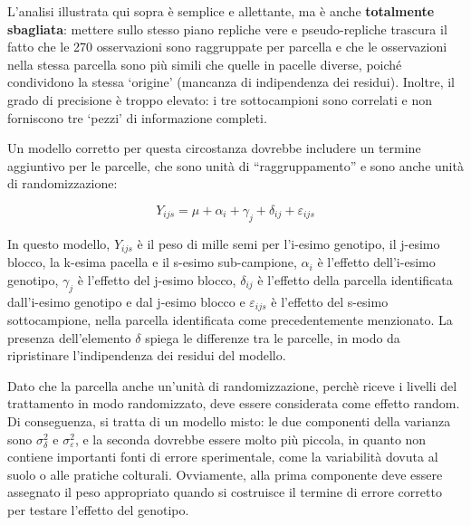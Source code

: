 \documentclass[
  12pt,
]{book}
\newenvironment{Shaded}{\begin{snugshade}}{\end{snugshade}}
\newcommand{\CommentTok}[1]{\textcolor[rgb]{0.56,0.35,0.01}{\textit{#1}}}
\newcommand{\DocumentationTok}[1]{\textcolor[rgb]{0.56,0.35,0.01}{\textbf{\textit{#1}}}}
\newcommand{\FloatTok}[1]{\textcolor[rgb]{0.00,0.00,0.81}{#1}}
\newcommand{\FunctionTok}[1]{\textcolor[rgb]{0.00,0.00,0.00}{#1}}
\newcommand{\NormalTok}[1]{#1}
\newcommand{\OtherTok}[1]{\textcolor[rgb]{0.56,0.35,0.01}{#1}}
\newcommand{\SpecialCharTok}[1]{\textcolor[rgb]{0.00,0.00,0.00}{#1}}
\begin{document}
\begin{Shaded}
\end{Shaded}

L'analisi illustrata qui sopra è semplice e allettante, ma è anche \textbf{totalmente sbagliata}: mettere sullo stesso piano repliche vere e pseudo-repliche trascura il fatto che le 270 osservazioni sono raggruppate per parcella e che le osservazioni nella stessa parcella sono più simili che quelle in pacelle diverse, poiché condividono la stessa `origine' (mancanza di indipendenza dei residui). Inoltre, il grado di precisione è troppo elevato: i tre sottocampioni sono correlati e non forniscono tre `pezzi' di informazione completi.

Un modello corretto per questa circostanza dovrebbe includere un termine aggiuntivo per le parcelle, che sono unità di ``raggruppamento'' e sono anche unità di randomizzazione:

\[Y_{ijs} = \mu + \alpha_i + \gamma_j + \delta_{ij} + \varepsilon_{ijs}\]

In questo modello, \(Y_{ijs}\) è il peso di mille semi per l'i-esimo genotipo, il j-esimo blocco, la k-esima pacella e il s-esimo sub-campione, \(\alpha_i\) è l'effetto dell'i-esimo genotipo, \(\gamma_j\) è l'effetto del j-esimo blocco, \(\delta_{ij}\) è l'effetto della parcella identificata dall'i-esimo genotipo e dal j-esimo blocco e \(\varepsilon_{ijs}\) è l'effetto del s-esimo sottocampione, nella parcella identificata come precedentemente menzionato. La presenza dell'elemento \(\delta\) spiega le differenze tra le parcelle, in modo da ripristinare l'indipendenza dei residui del modello.

Dato che la parcella anche un'unità di randomizzazione, perchè riceve i livelli del trattamento in modo randomizzato, deve essere considerata come effetto random. Di conseguenza, si tratta di un modello misto: le due componenti della varianza sono \(\sigma^2_{\delta}\) e \(\sigma^2_{\varepsilon}\), e la seconda dovrebbe essere molto più piccola, in quanto non contiene importanti fonti di errore sperimentale, come la variabilità dovuta al suolo o alle pratiche colturali. Ovviamente, alla prima componente deve essere assegnato il peso appropriato quando si costruisce il termine di errore corretto per testare l'effetto del genotipo.
\end{document}
